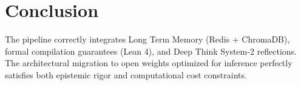 \documentclass[11pt,a4paper]{article}
\begin{document}
\section{Conclusion}
The pipeline correctly integrates Long Term Memory (Redis + ChromaDB), formal compilation guarantees (Lean 4), and Deep Think System-2 reflections. The architectural migration to open weights optimized for inference perfectly satisfies both epistemic rigor and computational cost constraints.
\end{document}
